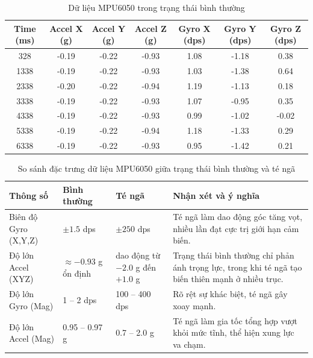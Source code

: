 \begin{table}[H]
\centering
\caption{Dữ liệu MPU6050 trong trạng thái bình thường}
\label{tab:normal_log_data}
\begin{tabular}{|c|c|c|c|c|c|c|}
\hline
\textbf{Time (ms)} & \textbf{Accel X (g)} & \textbf{Accel Y (g)} & \textbf{Accel Z (g)} & \textbf{Gyro X (dps)} & \textbf{Gyro Y (dps)} & \textbf{Gyro Z (dps)} \\
\hline
328  & -0.19 & -0.22 & -0.93 & 1.08 & -1.18 & 0.38 \\
1338 & -0.19 & -0.22 & -0.93 & 1.03 & -1.38 & 0.64 \\
2338 & -0.20 & -0.22 & -0.94 & 1.19 & -1.13 & 0.18 \\
3338 & -0.19 & -0.22 & -0.93 & 1.07 & -0.95 & 0.35 \\
4338 & -0.19 & -0.22 & -0.93 & 0.99 & -1.02 & -0.02 \\
5338 & -0.19 & -0.22 & -0.94 & 1.18 & -1.33 & 0.29 \\
6338 & -0.19 & -0.22 & -0.93 & 0.95 & -1.42 & 0.21 \\
\hline
\end{tabular}
\end{table}
\begin{table}[H]
\centering
\caption{So sánh đặc trưng dữ liệu MPU6050 giữa trạng thái bình thường và té ngã}
\label{tab:mpu6050_new_comparison}
\begin{tabularx}{\textwidth}{|l|p{2.5cm}|p{2.5cm}|X|}
\hline
\textbf{Thông số} & \textbf{Bình thường} & \textbf{Té ngã} & \textbf{Nhận xét và ý nghĩa} \\
\hline
Biên độ Gyro (X,Y,Z) & $\pm 1.5$ dps & $\pm 250$ dps & Té ngã làm dao động góc tăng vọt, nhiều lần đạt cực trị giới hạn cảm biến. \\
\hline
Độ lớn Accel (XYZ) & $\approx -0.93$ g ổn định & dao động từ $-2.0$ g đến $+1.0$ g & Trạng thái bình thường chỉ phản ánh trọng lực, trong khi té ngã tạo biến thiên mạnh ở nhiều trục. \\
\hline
Độ lớn Gyro (Mag) & 1 -- 2 dps & 100 -- 400 dps & Rõ rệt sự khác biệt, té ngã gây xoay mạnh. \\
\hline
Độ lớn Accel (Mag) & 0.95 -- 0.97 g & 0.7 -- 2.0 g & Té ngã làm gia tốc tổng hợp vượt khỏi mức tĩnh, thể hiện xung lực va chạm. \\
\hline
\end{tabularx}
\end{table}

